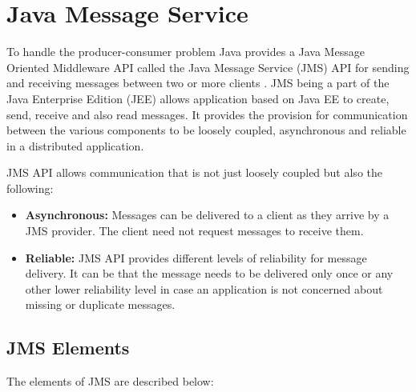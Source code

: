 \section{Java Message Service}

To handle the producer-consumer problem Java provides a Java Message Oriented Middleware API called the Java Message Service (JMS) API for sending and receiving messages between two or more clients \parencite{jms_wiki}.
JMS being a part of the Java Enterprise Edition (JEE) allows application based on Java EE to create, send, receive and also read messages. It provides the provision for communication between the various components to be loosely coupled, asynchronous and reliable in a distributed application. 

JMS API allows communication that is not just loosely coupled but also the following:

\begin{itemize}
    \item \textbf{Asynchronous:}
          Messages can be delivered to a client as they arrive by a JMS provider. The client need not request messages to receive them.

    \item \textbf{Reliable:}
          JMS API provides different levels of reliability for message delivery. It can be that the message needs to be delivered only once or any other lower reliability level in case an application is not concerned about missing or duplicate messages.

\end{itemize}

\subsection {JMS Elements}
The elements of JMS are described below:

